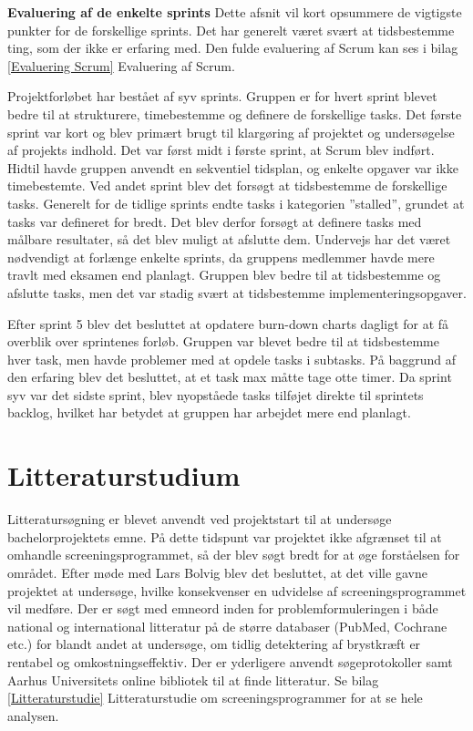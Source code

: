 \textbf{Evaluering af de enkelte sprints} 
Dette afsnit vil kort opsummere de vigtigste punkter for de forskellige sprints. Det har generelt været svært at tidsbestemme ting, som der ikke er erfaring med. Den fulde evaluering af Scrum kan ses i bilag \ref{Evaluering Scrum} Evaluering af Scrum.

Projektforløbet har bestået af syv sprints. Gruppen er for hvert sprint blevet bedre til at strukturere, timebestemme og definere de forskellige tasks. Det første sprint var kort og blev primært brugt til klargøring af projektet og undersøgelse af projekts indhold. Det var først midt i første sprint, at Scrum blev indført. Hidtil havde gruppen anvendt en sekventiel tidsplan, og enkelte opgaver var ikke timebestemte. Ved andet sprint blev det forsøgt at tidsbestemme de forskellige tasks. Generelt for de tidlige sprints endte tasks i kategorien ”stalled”, grundet at tasks var defineret for bredt. Det blev derfor forsøgt at definere tasks med målbare resultater, så det blev muligt at afslutte dem. Undervejs har det været nødvendigt at forlænge enkelte sprints, da gruppens medlemmer havde mere travlt med eksamen end planlagt. Gruppen blev bedre til at tidsbestemme og afslutte tasks, men det var stadig svært at tidsbestemme implementeringsopgaver.

Efter sprint 5 blev det besluttet at opdatere burn-down charts dagligt for at få overblik over sprintenes forløb. Gruppen var blevet bedre til at tidsbestemme hver task, men havde problemer med at opdele tasks i subtasks. På baggrund af den erfaring blev det besluttet, at et task max måtte tage otte timer. Da sprint syv var det sidste sprint, blev nyopståede tasks tilføjet direkte til sprintets backlog, hvilket har betydet at gruppen har arbejdet mere end planlagt.
\newpage
\section{Litteraturstudium}
Litteratursøgning er blevet anvendt ved projektstart til at undersøge bachelorprojektets emne. På dette tidspunt var projektet ikke afgrænset til at omhandle screeningsprogrammet, så der blev søgt bredt for at øge forståelsen for området. Efter møde med Lars Bolvig blev det besluttet, at det ville gavne projektet at undersøge, hvilke konsekvenser en udvidelse af screeningsprogrammet vil medføre. Der er søgt med emneord inden for problemformuleringen i både national og international litteratur på de større databaser (PubMed, Cochrane etc.) for blandt andet at undersøge, om tidlig detektering af brystkræft er rentabel og omkostningseffektiv. Der er yderligere anvendt søgeprotokoller samt Aarhus Universitets online bibliotek til at finde litteratur. Se bilag \ref{Litteraturstudie} Litteraturstudie om screeningsprogrammer for at se hele analysen. 

